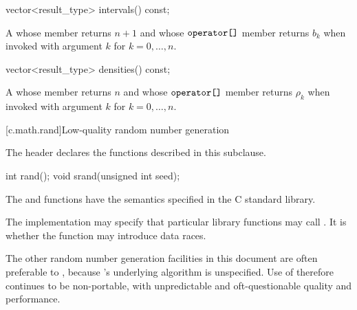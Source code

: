 %
\begin{itemdecl}
vector<result_type> intervals() const;
\end{itemdecl}

\begin{itemdescr}
\pnum
\returns
A 
 whose  member returns $n + 1$
 and whose $ \texttt{operator[]} $ member returns $b_k$
 when invoked with argument $k$ for $k = 0, \dotsc, n$.
\end{itemdescr}

%
\begin{itemdecl}
vector<result_type> densities() const;
\end{itemdecl}

\begin{itemdescr}
\pnum
\returns
A 
 whose  member returns $n$
 and whose $ \texttt{operator[]} $ member returns $\rho_k$
 when invoked with argument $k$ for $k = 0, \dotsc, n$.
\end{itemdescr}%
%
%
%
%

[c.math.rand]{Low-quality random number generation}

\pnum
\begin{note}
The header 
declares the functions described in this subclause.
\end{note}

%
%
\begin{itemdecl}
int rand();
void srand(unsigned int seed);
\end{itemdecl}

\begin{itemdescr}
\pnum
\effects
The
 and 
functions have the semantics specified in the C standard library.

\pnum
\remarks
The implementation
may specify that particular library functions may call
.
It is 
whether the  function
may introduce data races.
\begin{note}
%
The other random
number generation facilities in this document are often preferable
to , because 's underlying algorithm is unspecified.
Use of  therefore continues to be non-portable, with unpredictable
and oft-questionable quality and performance.
\end{note}
\end{itemdescr}

